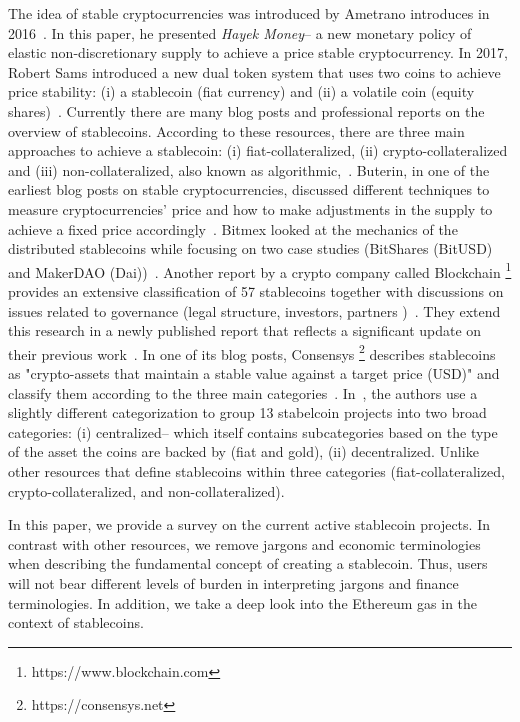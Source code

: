 The idea of stable cryptocurrencies was introduced by Ametrano introduces in 2016~\cite{ametrano2016hayek}. In this paper, he presented \textit{Hayek Money}-- a new monetary policy of elastic non-discretionary supply to achieve a price stable cryptocurrency. In 2017, Robert Sams introduced a new dual token system that uses two coins to achieve price stability: (i) a stablecoin (\eg fiat currency) and (ii) a volatile coin (\eg equity shares)~\cite{sams2015note}.
Currently there are many blog posts and professional reports on the overview of stablecoins. According to these resources, there are three main approaches to achieve a stablecoin: (i) fiat-collateralized, (ii) crypto-collateralized and (iii) non-collateralized, also known as algorithmic,\eg~\cite{hackernoon, comprehensiveOverview, linkedin}. Buterin, in one of the earliest blog posts on stable cryptocurrencies, discussed different techniques to measure cryptocurrencies' price and how to make adjustments in the supply to achieve a fixed price accordingly~\cite{TheSearc7:online}. Bitmex looked at the mechanics of the distributed stablecoins while focusing on two case studies (\ie BitShares (BitUSD) and MakerDAO (Dai))~\cite{bitmex}. Another report by a crypto company called Blockchain \footnote{https://www.blockchain.com} provides an extensive classification of 57 stablecoins together with discussions on issues related to governance (\eg legal structure, investors, partners \etc)~\cite{reportone}. They extend this research in a newly published report that reflects a significant update on their previous work~\cite{reporttwo}. In one of its blog posts, Consensys \footnote{https://consensys.net} describes stablecoins as "crypto-assets that maintain a stable value against a target price (\eg USD)" and classify them according to the three main categories~\cite{StateofS96:online}. In~\cite{cryptoinsider}, the authors use a slightly different categorization to group 13 stabelcoin projects into two broad categories: (i) centralized-- which itself contains subcategories based on the type of the asset the coins are backed by (\eg fiat and gold), (ii) decentralized. Unlike other resources that define stablecoins within three categories (fiat-collateralized, crypto-collateralized, and non-collateralized). \par
In this paper, we provide a survey on the current active stablecoin projects. In contrast with other resources, we remove jargons and economic terminologies when describing the fundamental concept of creating a stablecoin. Thus, users will not  bear different levels of burden in interpreting jargons and finance terminologies. In addition, we take a deep look into the Ethereum gas in the context of stablecoins.


